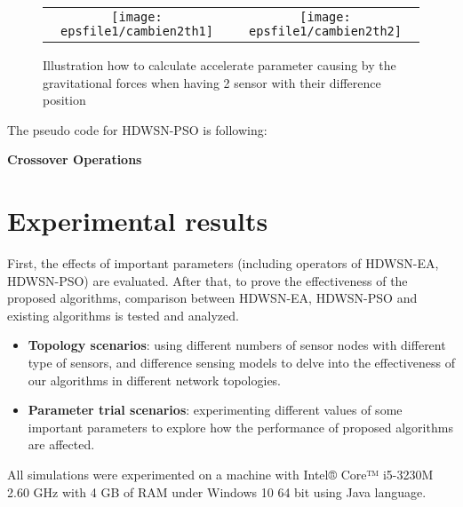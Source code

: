 \documentclass[final]{elsarticle}
\begin{document}
\begin{figure*}[h] 
	\centering
	\begin{tabular}{cc}
	\texttt{[image: epsfile1/cambien2th1]} &\texttt{[image: epsfile1/cambien2th2]} \\
	
	\end{tabular}
	\caption{Illustration how to calculate accelerate parameter causing by the gravitational forces when having 2 sensor with their difference position}
	\label{Fig.9}       %
\end{figure*}
The pseudo code for HDWSN-PSO is following:\\
\begin{algorithm}[H]
	\SetAlgoLined
	\caption{\textbf{Crossover Operations}} 
	\label{alg7}
	\end {algorithm}

\section{Experimental results}
First, the effects of important parameters (including operators of HDWSN-EA, HDWSN-PSO) are evaluated. After that, to prove the effectiveness of the proposed algorithms, comparison between HDWSN-EA, HDWSN-PSO and existing algorithms is tested and analyzed.
\begin{itemize}
	\item \textbf{Topology scenarios}: using different numbers of sensor nodes with different type of sensors, and difference sensing models to delve into the effectiveness of our algorithms in different network topologies.
	\item \textbf{Parameter trial scenarios}: experimenting different values of some important parameters to explore how the performance of proposed algorithms are affected.
\end{itemize}
All simulations were experimented on a machine with Intel® Core™ i5-3230M 2.60 GHz with 4 GB of RAM under Windows 10 64 bit using Java language. 
\end{document}
